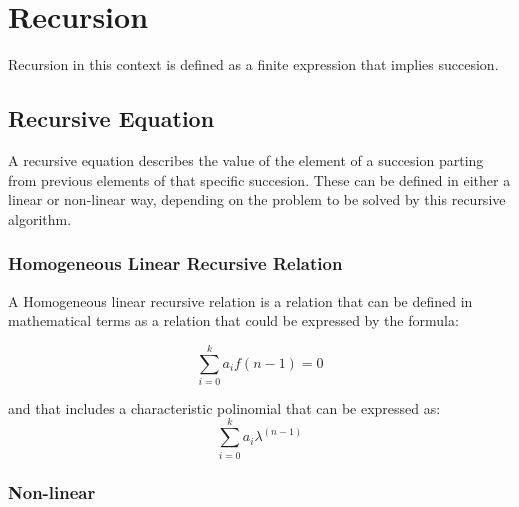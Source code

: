 \documentclass[12pt,a4paper,teal]{bbe}
\begin{document}
	\chapter[]{Recursion}
	Recursion in this context is defined as a finite expression that implies
	succesion.
	\section{Recursive Equation}
	A recursive equation describes the value of the element of a succesion 
	parting from previous elements of that specific succesion. These can be defined
	in either a linear or non-linear way, depending on the problem to be solved by
	this recursive algorithm.
	\subsection{Homogeneous Linear Recursive Relation}
	A Homogeneous linear recursive relation is a relation that can be defined
	in mathematical terms as a relation that could be expressed by the formula:

	$$ \sum_{i = 0}^{k} a_i f(n-1) = 0 $$

	and that includes a characteristic polinomial that can be expressed as:
	$$\sum_{i = 0}^{k} a_i \lambda^(n-1)$$

	\subsection{Non-linear}
\end{document}
